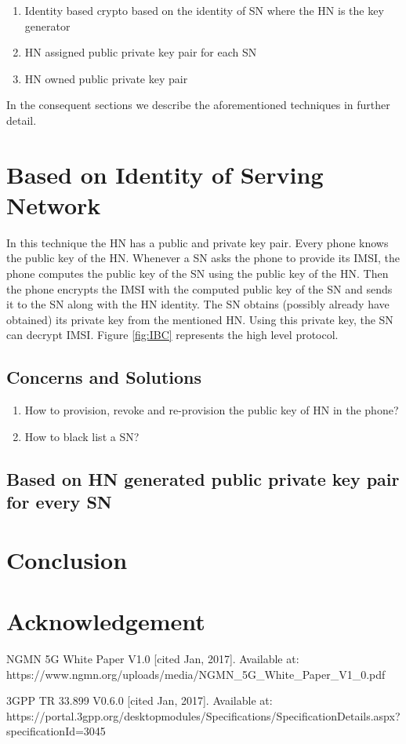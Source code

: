 \documentclass[lnicst,sechang,a4paper]{svmultln}
\begin{document}
\begin{enumerate}
\item Identity based crypto based on the identity of SN where the HN is the key generator
\item HN assigned public private key pair for each SN
\item HN owned public private key pair
\end{enumerate}

In the consequent sections we describe the aforementioned techniques in further detail.

\section{Based on Identity of Serving Network} In this technique the HN has a public and private key pair. Every phone knows the public key of the HN. Whenever a SN asks the phone to provide its IMSI, the phone computes the public key of the SN using the public key of the HN. Then the phone encrypts the IMSI with the computed public key of the SN and sends it to the SN along with the HN identity. The SN obtains (possibly already have obtained) its private key from the mentioned HN. Using this private key, the SN can decrypt IMSI. Figure \ref{fig:IBC} represents the high level protocol.

\subsection{Concerns and Solutions}
\begin{enumerate}
\item How to provision, revoke and re-provision the public key of HN in the phone?
\item How to black list a SN?
\end{enumerate}

\subsection{Based on HN generated public private key pair for every SN}

\section{Conclusion}
\label{sec:conclusion}

\section{Acknowledgement}
\label{sec:acknowledgement}



\begin{thebibliography}{4}

 NGMN 5G White Paper V1.0 [cited Jan, 2017]. Available at: https://www.ngmn.org/uploads/media/NGMN\_5G\_White\_Paper\_V1\_0.pdf


 3GPP TR 33.899 V0.6.0 [cited Jan, 2017]. Available at: https://portal.3gpp.org/desktopmodules/Specifications/SpecificationDetails.aspx?specificationId=3045
\end{thebibliography}
\end{document}
